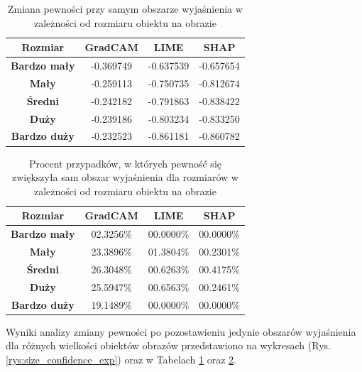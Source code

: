 \begin{table}[h]
	\centering
	\begin{tabular}{|c|c|c|c|}
		\hline
		\textbf{Rozmiar}     & \textbf{GradCAM} & \textbf{LIME} & \textbf{SHAP} \\
		\hline
		\textbf{Bardzo mały} & -0.369749        & -0.637539     & -0.657654     \\
		\hline
		\textbf{Mały}        & -0.259113        & -0.750735     & -0.812674     \\
		\hline
		\textbf{Średni}      & -0.242182        & -0.791863     & -0.838422     \\
		\hline
		\textbf{Duży}        & -0.239186        & -0.803234     & -0.833250     \\
		\hline
		\textbf{Bardzo duży} & -0.232523        & -0.861181     & -0.860782     \\
		\hline
	\end{tabular}
	\caption{Zmiana pewności przy samym obszarze wyjaśnienia w zależności od rozmiaru obiektu na obrazie}
	\label{tab:size_confidence_exp}
\end{table}

\begin{table}[h]
	\centering
	\begin{tabular}{|c|c|c|c|}
		\hline
		\textbf{Rozmiar}     & \textbf{GradCAM} & \textbf{LIME} & \textbf{SHAP} \\
		\hline
		\textbf{Bardzo mały} & 02.3256\%        & 00.0000\%     & 00.0000\%     \\
		\hline
		\textbf{Mały}        & 23.3896\%        & 01.3804\%     & 00.2301\%     \\
		\hline
		\textbf{Średni}      & 26.3048\%        & 00.6263\%     & 00.4175\%     \\
		\hline
		\textbf{Duży}        & 25.5947\%        & 00.6563\%     & 00.2461\%     \\
		\hline
		\textbf{Bardzo duży} & 19.1489\%        & 00.0000\%     & 00.0000\%     \\
		\hline
	\end{tabular}
	\caption{Procent przypadków, w których pewność się zwiększyła sam obszar wyjaśnienia dla rozmiarów w zależności od rozmiaru obiektu na obrazie}
	\label{tab:size_confidence_exp_percent}
\end{table}

Wyniki analizy zmiany pewności po pozostawieniu jedynie obszarów wyjaśnienia dla różnych wielkości obiektów obrazów przedstawiono na wykresach (Rys. \ref{rys:size_confidence_exp}) oraz w Tabelach \ref{tab:size_confidence_exp} oraz \ref{tab:size_confidence_exp_percent}.

